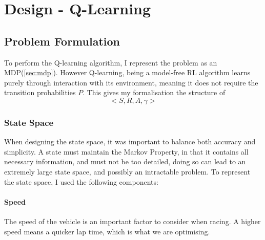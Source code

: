 \chapter{Design - Q-Learning}
\section{Problem Formulation}
To perform the Q-learning algorithm, I represent the problem as an MDP(\ref{sec:mdp}). However Q-learning, being a model-free RL algorithm learns purely through interaction with its environment, meaning it does not require the transition probabilities $P$. This gives my formalisation the structure of $$<S, R, A, \gamma>$$
\subsection{State Space}
When designing the state space, it was important to balance both accuracy and simplicity. A state must maintain the Markov Property, in that it contains all necessary information, and must not be too detailed, doing so can lead to an extremely large state space, and possibly an intractable problem. To represent the state space, I used the following components:
\subsubsection{Speed}
The speed of the vehicle is an important factor to consider when racing. A higher speed means a quicker lap time, which is what we are optimising.
